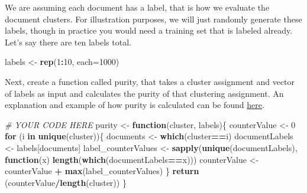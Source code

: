 \documentclass[]{article}
\newenvironment{Shaded}{\begin{snugshade}}{\end{snugshade}}
\newcommand{\CommentTok}[1]{\textcolor[rgb]{0.56,0.35,0.01}{\textit{#1}}}
\newcommand{\ControlFlowTok}[1]{\textcolor[rgb]{0.13,0.29,0.53}{\textbf{#1}}}
\newcommand{\DataTypeTok}[1]{\textcolor[rgb]{0.13,0.29,0.53}{#1}}
\newcommand{\DecValTok}[1]{\textcolor[rgb]{0.00,0.00,0.81}{#1}}
\newcommand{\KeywordTok}[1]{\textcolor[rgb]{0.13,0.29,0.53}{\textbf{#1}}}
\newcommand{\NormalTok}[1]{#1}
\newcommand{\OperatorTok}[1]{\textcolor[rgb]{0.81,0.36,0.00}{\textbf{#1}}}
\newcommand{\StringTok}[1]{\textcolor[rgb]{0.31,0.60,0.02}{#1}}
\begin{document}
\begin{Shaded}
\end{Shaded}

We are assuming each document has a label, that is how we evaluate the
document clusters. For illustration purposes, we will just randomly
generate these labels, though in practice you would need a training set
that is labeled already. Let's say there are ten labels total.

\begin{Shaded}
\begin{Highlighting}[]
\NormalTok{labels <-}\StringTok{ }\KeywordTok{rep}\NormalTok{(}\DecValTok{1}\OperatorTok{:}\DecValTok{10}\NormalTok{, }\DataTypeTok{each=}\DecValTok{1000}\NormalTok{)}
\end{Highlighting}
\end{Shaded}

Next, create a function called purity, that takes a cluster assignment
and vector of labels as input and calculates the purity of that
clustering assignment. An explanation and example of how purity is
calculated can be found
\href{http://nlp.stanford.edu/IR-book/html/htmledition/evaluation-of-clustering-1.html}{here}.

\begin{Shaded}
\begin{Highlighting}[]
\CommentTok{# YOUR CODE HERE}
\NormalTok{purity <-}\StringTok{ }\ControlFlowTok{function}\NormalTok{(cluster, labels)\{}
\NormalTok{  counterValue <-}\StringTok{ }\DecValTok{0}
  \ControlFlowTok{for}\NormalTok{ (i }\ControlFlowTok{in} \KeywordTok{unique}\NormalTok{(cluster))\{}
\NormalTok{    documents <-}\StringTok{ }\KeywordTok{which}\NormalTok{(cluster}\OperatorTok{==}\NormalTok{i)}
\NormalTok{    documentLabels <-}\StringTok{ }\NormalTok{labels[documents]}
\NormalTok{    label_counterValues <-}\StringTok{ }\KeywordTok{sapply}\NormalTok{(}\KeywordTok{unique}\NormalTok{(documentLabels), }\ControlFlowTok{function}\NormalTok{(x) }\KeywordTok{length}\NormalTok{(}\KeywordTok{which}\NormalTok{(documentLabels}\OperatorTok{==}\NormalTok{x)))}
\NormalTok{    counterValue <-}\StringTok{ }\NormalTok{counterValue }\OperatorTok{+}\StringTok{ }\KeywordTok{max}\NormalTok{(label_counterValues)}
\NormalTok{  \}}
  \KeywordTok{return}\NormalTok{ (counterValue}\OperatorTok{/}\KeywordTok{length}\NormalTok{(cluster))}
\NormalTok{\}}
\end{Highlighting}
\end{Shaded}
\end{document}
